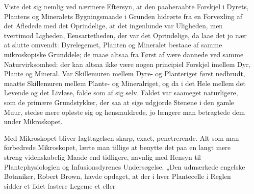 \documentclass[12pt,a4paper]{book}
\begin{document}
Viste det sig nemlig ved nærmere Eftersyn, at den paaberaabte Forskjel i
Dyrets, Plantens og Mineralets Bygningsmaade i Grunden hidrørte fra en
Forvexling af det Afledede med det Oprindelige, at det ingenlunde var
Uligheden, men tvertimod Ligheden, Eensartetheden, der var det
Oprindelige, da laae det jo nær at slutte omvendt: Dyrelegemet, Planten og
Mineralet bestaae af samme mikroskopiske Grunddele; de maae altsaa fra
Først af være dannede ved samme Naturvirksomhed; der kan altsaa ikke være
nogen principiel Forskjel imellem Dyr, Plante og Mineral. Var Skillemuren
mellem Dyre- og Planteriget først nedbrudt, maatte Skillemuren mellem
Plante- og Mineralriget, og da i det Hele mellem det Levende og det
Livløse, falde som af sig selv. Faldet var saameget naturligere, som de
primære Grundstykker, der saa at sige udgjorde Stenene i den gamle Muur,
stedse mere opløste sig og hensmuldrede, jo længere man betragtede dem
under Mikroskopet.

Med Mikroskopet bliver Iagttagelsen skarp, exact, penetrerende. Alt som
man forbedrede Mikroskopet, lærte man tillige at benytte det paa en langt
mere streng videnskabelig Maade end tidligere, navnlig med Hensyn til
Plantephysiologien og Infusionsdyrenes Undersøgelse. „Den udmærkede
engelske Botaniker, Robert Brown, havde opdaget, at der i hver
Plantecelle i Reglen sidder et lidet fastere Legeme et eller
\end{document}
